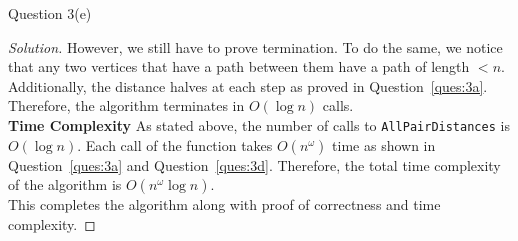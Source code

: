 \begin{solution}{Question 3(e)}
\begin{proof}[Solution]
      However, we still have to prove termination. To do the same, we notice that any two vertices that have a path between them have a path of length $< n$. Additionally, the distance halves at each step as proved in Question~\ref{ques:3a}. Therefore, the algorithm terminates in $O(\log{n})$ calls.\\
      \textbf{Time Complexity} As stated above, the number of calls to \texttt{AllPairDistances} is $O(\log{n})$. Each call of the function takes $O(n^\omega)$ time as shown in Question~\ref{ques:3a} and Question~\ref{ques:3d}. Therefore, the total time complexity of the algorithm is $O(n^\omega \log{n})$.\\
      This completes the algorithm along with proof of correctness and time complexity.
    \end{proof}
\end{solution}
